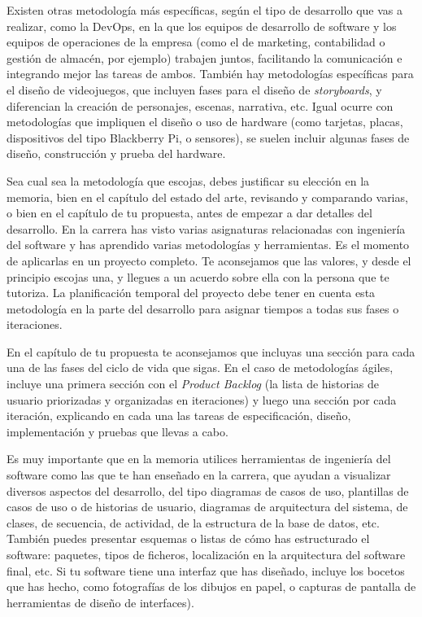 Existen otras metodología más específicas, según el tipo de desarrollo que vas a realizar, como la DevOps, en la que los  equipos de desarrollo  de software y los equipos de operaciones de la empresa (como el de marketing, contabilidad o gestión de almacén, por ejemplo) trabajen juntos, facilitando la comunicación e integrando mejor las tareas de ambos. También hay metodologías específicas para el diseño de videojuegos, que incluyen fases para el diseño de \textit{storyboards}, y diferencian la creación de personajes, escenas, narrativa, etc. Igual ocurre con metodologías que impliquen el diseño o uso de hardware (como tarjetas, placas, dispositivos del tipo Blackberry Pi, o sensores), se suelen incluir algunas fases de diseño, construcción y prueba del hardware. 


Sea cual sea la metodología que escojas, debes justificar su elección en la memoria, bien en el capítulo del estado del arte,  revisando y comparando varias, o bien en el capítulo de tu propuesta, antes de empezar a dar detalles del desarrollo. En la carrera has visto varias asignaturas relacionadas con ingeniería del software y has aprendido varias metodologías y herramientas. Es el momento de aplicarlas en un proyecto completo. Te aconsejamos que las valores, y desde el principio escojas una, y llegues a un acuerdo sobre ella con la persona que te tutoriza. La planificación temporal del proyecto debe tener en cuenta esta metodología en la parte del desarrollo para asignar tiempos a todas sus fases o iteraciones. 

En el capítulo de tu propuesta te aconsejamos que incluyas una sección para cada una de las fases del ciclo de vida que sigas. En el caso de metodologías ágiles, incluye una primera sección con el \textit{Product Backlog} (la lista de historias de usuario priorizadas y organizadas en iteraciones) y luego una sección por cada iteración, explicando en cada una las tareas de especificación, diseño, implementación y pruebas que llevas a cabo.

Es muy importante que en la memoria utilices herramientas de ingeniería del software como las que te han enseñado en la carrera, que ayudan a visualizar diversos aspectos del desarrollo, del tipo diagramas de casos de uso, plantillas de casos de uso o de historias de usuario, diagramas de arquitectura del sistema, de clases, de secuencia, de actividad, de la estructura de la base de datos, etc. También puedes presentar esquemas o listas de cómo has estructurado el software: paquetes, tipos de ficheros, localización en la arquitectura del software final, etc. Si tu software tiene una interfaz que has diseñado, incluye los bocetos que has hecho, como fotografías de los dibujos en papel, o capturas de pantalla de herramientas de diseño de interfaces). 

